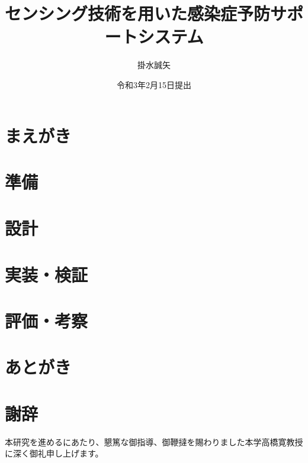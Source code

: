 

\newenvironment{indention}[1]{\par
\addtolength{\leftskip}{#1}
\begingroup}{\endgroup\par}


\title{センシング技術を用いた感染症予防サポートシステム}
\author{掛水誠矢}
\date{令和3年2月15日提出}


\maketitle
\tableofcontents
\cleardoublepage
{}

\chapter{まえがき}


\chapter{準備}


\chapter{設計}






\chapter{実装・検証}




\chapter{評価・考察}


\chapter{あとがき}





\newpage
{}
\chapter*{謝辞}
本研究を進めるにあたり、懇篤な御指導、御鞭撻を賜わりました本学高橋寛教授に深く御礼申し上げます。

